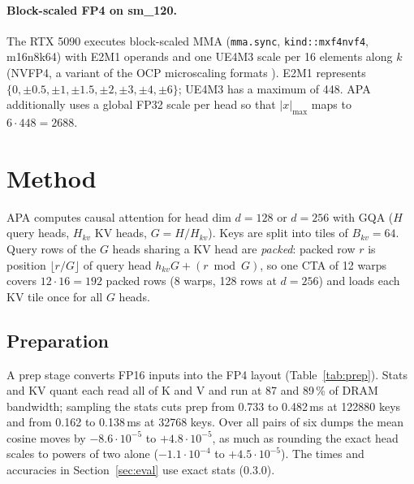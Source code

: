 \documentclass[10pt,twocolumn]{article}
\newcommand{\code}[1]{\texttt{#1}}
\begin{document}
\paragraph{Block-scaled FP4 on sm\_120.} The RTX 5090 executes
block-scaled MMA (\code{mma.sync}, \code{kind::mxf4nvf4}, m16n8k64) with E2M1 operands and one UE4M3 scale per 16 elements
along $k$ (NVFP4, a variant of the OCP microscaling formats \cite{rouhani2023microscaling}). E2M1 represents
$\{0,\pm0.5,\pm1,\pm1.5,\pm2,\pm3,\pm4,\pm6\}$; UE4M3 has a maximum of 448. APA additionally uses a global FP32
scale per head so that $|x|_{\max}$ maps to $6\cdot448=2688$.

\section{Method}

APA computes causal attention for head dim $d=128$ or $d=256$ with GQA ($H$ query heads, $H_{kv}$ KV heads,
$G=H/H_{kv}$). Keys are split into tiles of $B_{kv}=64$. Query rows of the $G$ heads sharing a KV head are
\emph{packed}: packed row $r$ is position $\lfloor r/G\rfloor$ of query head $h_{kv}G+(r\bmod G)$, so one CTA
of 12 warps covers $12\cdot16=192$ packed rows (8 warps, 128 rows at $d=256$) and loads each KV tile once for all $G$ heads.

\subsection{Preparation}

A prep stage converts FP16 inputs into the FP4 layout (Table~\ref{tab:prep}). Stats and KV quant each read
all of K and V and run at 87 and 89\,\% of DRAM bandwidth; sampling the stats cuts prep from 0.733 to
0.482\,ms at 122880 keys and from 0.162 to 0.138\,ms at 32768 keys. Over all pairs of six dumps the mean
cosine moves by $-8.6\cdot10^{-5}$ to $+4.8\cdot10^{-5}$, as much as rounding the exact head scales to powers of two
alone ($-1.1\cdot10^{-4}$ to $+4.5\cdot10^{-5}$). The times and accuracies in Section~\ref{sec:eval} use exact
stats (0.3.0).
\end{document}
